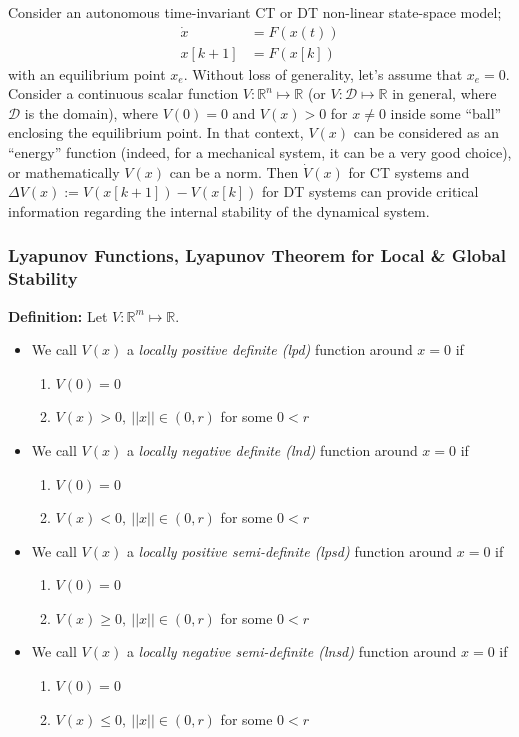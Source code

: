 \documentclass[twoside, 11pt]{article}
\begin{document}
Consider an autonomous time-invariant CT or DT non-linear state-space model;
%
\begin{align*}
    \dot{x} &= F(x(t)) \\
    x[k+1] &= F(x[k])
\end{align*}
%
with an equilibrium point $x_e$. Without loss of generality, let's assume that $x_e = 0$. Consider a continuous
scalar function $V : \mathbb{R}^{n} \mapsto \mathbb{R}$ (or $V : \mathcal{D} \mapsto \mathbb{R}$ in general, where $\mathcal{D}$ is the domain), where $V(0) = 0$ and $V(x) > 0$ for $x \neq 0$ inside some ``ball'' enclosing the equilibrium point. 
In that context, $V(x)$ can be considered as an ``energy'' function (indeed, for a mechanical system, it can be a very good choice), or mathematically $V(x)$ can be a norm. Then $\dot{V}(x)$ for CT systems and $\Delta V(x) := V(x[k+1]) - V(x[k])$ 
for DT systems can provide critical information regarding the internal stability of the dynamical system.

\subsubsection*{Lyapunov Functions, Lyapunov Theorem for Local \& Global Stability}

\textbf{Definition:} Let $V : \mathbb{R}^{m} \mapsto \mathbb{R}$. 
\begin{itemize}
\item We call $V(x)$ a \textit{locally positive definite (lpd)} function around $x = 0$ if 
\begin{enumerate}
    \item $V(0) = 0$
    \item $V(x) > 0, \ || x || \in (0 , r)$ for some $0 < r$
\end{enumerate}
%
\item We call $V(x)$ a \textit{locally negative definite (lnd)} function around $x = 0$ if 
\begin{enumerate}
    \item $V(0) = 0$
    \item $V(x) < 0, \ || x || \in (0 , r)$ for some $0 < r$
\end{enumerate}
%
%
\item We call $V(x)$ a \textit{locally positive semi-definite (lpsd)} function around $x = 0$ if 
\begin{enumerate}
    \item $V(0) = 0$
    \item $V(x) \geq 0, \ || x || \in (0 , r)$ for some $0 < r$
\end{enumerate}
%
%
\item We call $V(x)$ a \textit{locally negative semi-definite (lnsd)} function around $x = 0$ if 
\begin{enumerate}
    \item $V(0) = 0$
    \item $V(x) \leq 0, \ || x || \in (0 , r)$ for some $0 < r$
\end{enumerate}
%
\end{itemize}
\end{document}
